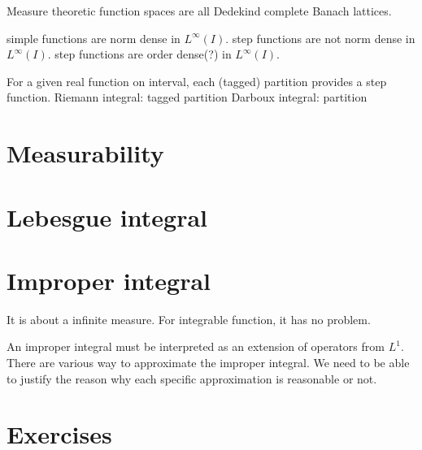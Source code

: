 \documentclass{../../large}
\begin{document}
Measure theoretic function spaces are all Dedekind complete Banach lattices.

simple functions are norm dense in $L^\infty(I)$.
step functions are not norm dense in $L^\infty(I)$.
step functions are order dense(?) in $L^\infty(I)$.




For a given real function on interval, each (tagged) partition provides a step function.
Riemann integral: tagged partition
Darboux integral: partition


\begin{prb}
\end{prb}



\section{Measurability}

\begin{prb}
\end{prb}

\begin{prb}
\end{prb}




\section{Lebesgue integral}


\begin{prb}
\end{prb}


\section{Improper integral}
It is about a infinite measure.
For integrable function, it has no problem.

An improper integral must be interpreted as an extension of operators from $L^1$.
There are various way to approximate the improper integral.
We need to be able to justify the reason why each specific approximation is reasonable or not.




\section*{Exercises}
\end{document}
